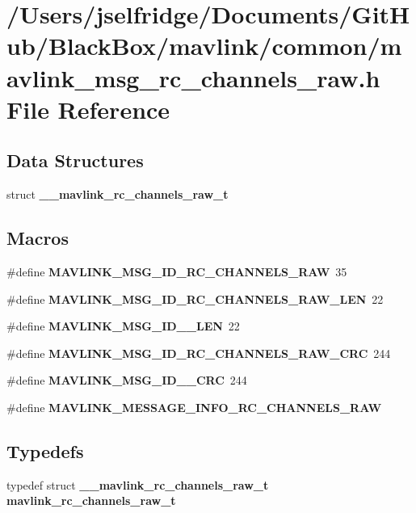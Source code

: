 \section{/\+Users/jselfridge/\+Documents/\+Git\+Hub/\+Black\+Box/mavlink/common/mavlink\+\_\+msg\+\_\+rc\+\_\+channels\+\_\+raw.h File Reference}
\label{mavlink__msg__rc__channels__raw_8h}
\subsection*{Data Structures}
\begin{DoxyCompactItemize}
\item 
struct \textbf{ \+\_\+\+\_\+mavlink\+\_\+rc\+\_\+channels\+\_\+raw\+\_\+t}
\end{DoxyCompactItemize}
\subsection*{Macros}
\begin{DoxyCompactItemize}
\item 
\#define \textbf{ M\+A\+V\+L\+I\+N\+K\+\_\+\+M\+S\+G\+\_\+\+I\+D\+\_\+\+R\+C\+\_\+\+C\+H\+A\+N\+N\+E\+L\+S\+\_\+\+R\+AW}~35
\item 
\#define \textbf{ M\+A\+V\+L\+I\+N\+K\+\_\+\+M\+S\+G\+\_\+\+I\+D\+\_\+\+R\+C\+\_\+\+C\+H\+A\+N\+N\+E\+L\+S\+\_\+\+R\+A\+W\+\_\+\+L\+EN}~22
\item 
\#define \textbf{ M\+A\+V\+L\+I\+N\+K\+\_\+\+M\+S\+G\+\_\+\+I\+D\+\_\+\_\+\+L\+EN}~22
\item 
\#define \textbf{ M\+A\+V\+L\+I\+N\+K\+\_\+\+M\+S\+G\+\_\+\+I\+D\+\_\+\+R\+C\+\_\+\+C\+H\+A\+N\+N\+E\+L\+S\+\_\+\+R\+A\+W\+\_\+\+C\+RC}~244
\item 
\#define \textbf{ M\+A\+V\+L\+I\+N\+K\+\_\+\+M\+S\+G\+\_\+\+I\+D\+\_\+\_\+\+C\+RC}~244
\item 
\#define \textbf{ M\+A\+V\+L\+I\+N\+K\+\_\+\+M\+E\+S\+S\+A\+G\+E\+\_\+\+I\+N\+F\+O\+\_\+\+R\+C\+\_\+\+C\+H\+A\+N\+N\+E\+L\+S\+\_\+\+R\+AW}
\end{DoxyCompactItemize}
\subsection*{Typedefs}
\begin{DoxyCompactItemize}
\item 
typedef struct \textbf{ \+\_\+\+\_\+mavlink\+\_\+rc\+\_\+channels\+\_\+raw\+\_\+t} \textbf{ mavlink\+\_\+rc\+\_\+channels\+\_\+raw\+\_\+t}
\end{DoxyCompactItemize}


